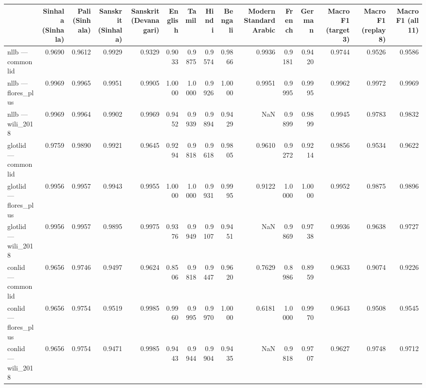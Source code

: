 \begin{tabular}{lrrrrrrrrrrrrrr}
\toprule
 & Sinhala (Sinhala) & Pali (Sinhala) & Sanskrit (Sinhala) & Sanskrit (Devanagari) & English & Tamil & Hindi & Bengali & Modern Standard Arabic & French & German & Macro F1 (target 3) & Macro F1 (replay 8) & Macro F1 (all 11) \\
\midrule
nllb — commonlid & 0.9690 & 0.9612 & 0.9929 & 0.9329 & 0.9033 & 0.9875 & 0.9574 & 0.9866 & 0.9936 & 0.9181 & 0.9420 & 0.9744 & 0.9526 & 0.9586 \\
nllb — flores\_plus & 0.9969 & 0.9965 & 0.9951 & 0.9905 & 1.0000 & 1.0000 & 0.9926 & 1.0000 & 0.9951 & 0.9995 & 0.9995 & 0.9962 & 0.9972 & 0.9969 \\
nllb — wili\_2018 & 0.9969 & 0.9964 & 0.9902 & 0.9969 & 0.9452 & 0.9939 & 0.9894 & 0.9429 & NaN & 0.9899 & 0.9899 & 0.9945 & 0.9783 & 0.9832 \\
glotlid — commonlid & 0.9759 & 0.9890 & 0.9921 & 0.9645 & 0.9294 & 0.9818 & 0.9618 & 0.9805 & 0.9610 & 0.9272 & 0.9214 & 0.9856 & 0.9534 & 0.9622 \\
glotlid — flores\_plus & 0.9956 & 0.9957 & 0.9943 & 0.9955 & 1.0000 & 1.0000 & 0.9931 & 0.9995 & 0.9122 & 1.0000 & 1.0000 & 0.9952 & 0.9875 & 0.9896 \\
glotlid — wili\_2018 & 0.9956 & 0.9957 & 0.9895 & 0.9975 & 0.9376 & 0.9949 & 0.9107 & 0.9451 & NaN & 0.9869 & 0.9738 & 0.9936 & 0.9638 & 0.9727 \\
conlid — commonlid & 0.9656 & 0.9746 & 0.9497 & 0.9624 & 0.8506 & 0.9818 & 0.9447 & 0.9620 & 0.7629 & 0.8986 & 0.8959 & 0.9633 & 0.9074 & 0.9226 \\
conlid — flores\_plus & 0.9656 & 0.9754 & 0.9519 & 0.9985 & 0.9960 & 0.9995 & 0.9970 & 1.0000 & 0.6181 & 1.0000 & 0.9970 & 0.9643 & 0.9508 & 0.9545 \\
conlid — wili\_2018 & 0.9656 & 0.9754 & 0.9471 & 0.9985 & 0.9443 & 0.9944 & 0.9904 & 0.9435 & NaN & 0.9818 & 0.9707 & 0.9627 & 0.9748 & 0.9712 \\
\bottomrule
\end{tabular}
